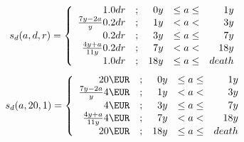 \begin{equation} \label{eq:sup_gross} \index{social support}
s_d(a,d,r) = \left\lbrace
 \begin{array}{rlrcr}
			1.0dr	&;& 0y &\leq a \leq&  1y\\
 \frac {7y-2a} y	0.2dr	&;& 1y &  <  a   < &  3y\\
			0.2dr	&;& 3y &\leq a \leq&  7y\\
 \frac {4y+a} {11y}	0.2dr	&;& 7y &  <  a   < & 18y\\
			1.0dr	&;&18y &\leq a \leq&death
 \end{array}
 \right.
\end{equation}
\begin{equation} \label{eq:sup_gross6} \index{social support}
s_d(a,20,1) = \left\lbrace
 \begin{array}{rlrcr}
			20\EUR	&;& 0y &\leq a \leq&  1y\\
 \frac {7y-2a} y	 4\EUR	&;& 1y &  <  a   < &  3y\\
			 4\EUR	&;& 3y &\leq a \leq&  7y\\
 \frac {4y+a} {11y}	 4\EUR	&;& 7y &  <  a   < & 18y\\
			20\EUR	&;&18y &\leq a \leq&death
 \end{array}
 \right.
\end{equation}
